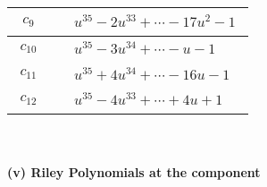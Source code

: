 \documentclass[1p]{elsarticle_modified}
\theoremstyle{definition}
\begin{document}
\begin{tabular}{m{50pt}|m{274pt}}
\hline $$\begin{aligned}c_{9}\end{aligned}$$&$\begin{aligned}
&u^{35}-2 u^{33}+\cdots-17 u^2-1
\end{aligned}$\\
\hline $$\begin{aligned}c_{10}\end{aligned}$$&$\begin{aligned}
&u^{35}-3 u^{34}+\cdots- u-1
\end{aligned}$\\
\hline $$\begin{aligned}c_{11}\end{aligned}$$&$\begin{aligned}
&u^{35}+4 u^{34}+\cdots-16 u-1
\end{aligned}$\\
\hline $$\begin{aligned}c_{12}\end{aligned}$$&$\begin{aligned}
&u^{35}-4 u^{33}+\cdots+4 u+1
\end{aligned}$\\
\hline
\end{tabular}\\~\\
\newpage\renewcommand{\arraystretch}{1}
\flushleft \textbf{(v) Riley Polynomials at the component}\newline \\
\end{document}
